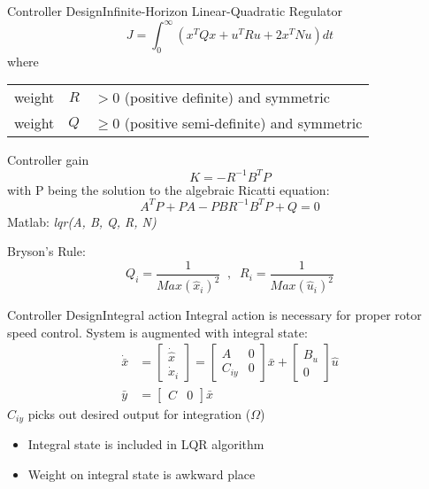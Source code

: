 \begin{frame}{Controller Design}{Infinite-Horizon Linear-Quadratic Regulator}
	\begin{equation}\label{eq:lqr_cost}
		J = \int_{0}^{\infty} \left(x^T Q x + u^T R u + 2x^T N u\right) dt
	\end{equation}
	where
	\begin{center}
		\begin{tabular}{l r l }
			weight & $R$         & $ > 0$\hspace{1mm} (positive definite) and symmetric       \\
			weight & $Q$		 & $\ge 0$\hspace{1mm} (positive semi-definite) and symmetric
		\end{tabular}
	\end{center}
	Controller gain
	\begin{equation}\label{eq:lqr_K}
		K = -R^{-1} B^T P
	\end{equation}
	with P being the solution to the algebraic Ricatti equation:
	\begin{equation}\label{lqr:ricatti}
		A^T P + P A - P B R^{-1} B^T P + Q = 0
	\end{equation}
	Matlab: \textit{lqr(A, B, Q, R, N)}
	
	\smallskip
	Bryson's Rule:
	\begin{equation}\label{eq:bryson}
			Q_i = \dfrac{1}{Max(\hat x_i)^2} \;\; , \;\; R_i = \dfrac{1}{Max(\hat u_i)^2}
	\end{equation}
\end{frame}


\begin{frame}{Controller Design}{Integral action}
	Integral action is necessary for proper rotor speed control. System is augmented with integral state:
	\begin{align} 
		\dot {\bar x} & = \begin{bmatrix} \dot{\hat x} \\ \dot x_i \end{bmatrix} = \begin{bmatrix} A &0 \\ C_{iy} & 0 \end{bmatrix} \bar x + \begin{bmatrix} B_u \\ 0 \end{bmatrix}  \hat u \\
		\bar y & = \begin{bmatrix} C & 0 \end{bmatrix} \bar x
	\end{align}
	$ C_{iy} $ picks out desired output for integration ($\Omega$)
	
	\begin{itemize}
		\item Integral state is included in LQR algorithm
		\item Weight on integral state is awkward place
	\end{itemize}
\end{frame}


